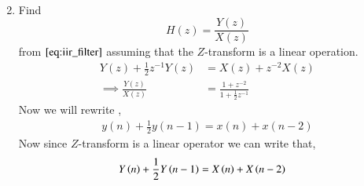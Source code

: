 \documentclass[journal,12pt,twocolumn]{IEEEtran}
\renewcommand\thesection{\arabic{section}}
\begin{document}
\begin{enumerate}[label=\thesection.\arabic*]
\begin{align}
    \end{align}
   \item Find
   \begin{equation}
   H(z) = \frac{Y(z)}{X(z)}
   \end{equation}
   from  $\eqref{eq:iir_filter}$ assuming that the $Z$-transform is a linear operation.
   \\
   \solution 
   \begin{align}
   Y(z) + \frac{1}{2}z^{-1}Y(z) &= X(z)+z^{-2}X(z)
   \\
   \implies \frac{Y(z)}{X(z)} &= \frac{1 + z^{-2}}{1 + \frac{1}{2}z^{-1}}
   \label{eq:freq_resp}
   \end{align}
    \solution 
     Now we will rewrite ,
      \begin{align}
          y(n) + \frac{1}{2}y(n-1) = x(n) + x(n-2)
      \end{align}
     Now since $Z$-transform is a linear operator we can write that,
      \begin{align}
          Y\left(n\right) + \frac{1}{2}Y\left(n-1\right) &= X\left(n\right) + X\left(n-2\right)
      \end{align}


\end{enumerate}
\end{document}
